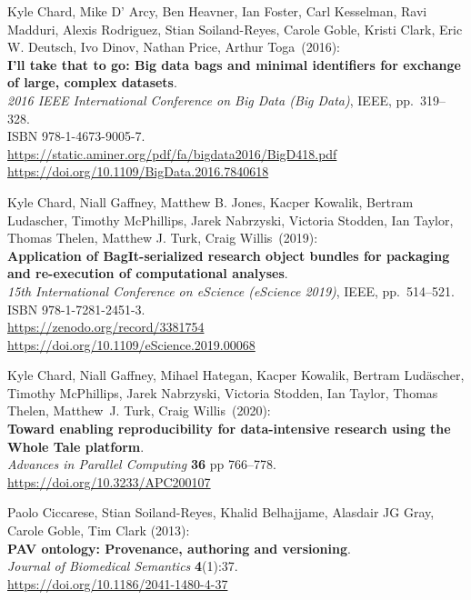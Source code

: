 \begin{thebibliography}{9}
Kyle Chard, Mike D' Arcy, Ben Heavner, Ian Foster, Carl
Kesselman, Ravi Madduri, Alexis Rodriguez, Stian Soiland-Reyes, Carole
Goble, Kristi Clark, Eric W. Deutsch, Ivo Dinov, Nathan Price, Arthur
Toga~(2016):\\
\textbf{I'll take that to go: Big data bags and minimal identifiers for
exchange of large, complex datasets}.\\
\emph{2016 IEEE International Conference on Big Data (Big Data)}, IEEE,
pp.~319--328.\\
ISBN 978-1-4673-9005-7.\\
\url{https://static.aminer.org/pdf/fa/bigdata2016/BigD418.pdf}\\
\url{https://doi.org/10.1109/BigData.2016.7840618}

Kyle Chard, Niall Gaffney, Matthew B. Jones, Kacper Kowalik,
Bertram Ludascher, Timothy McPhillips, Jarek Nabrzyski, Victoria
Stodden, Ian Taylor, Thomas Thelen, Matthew J. Turk, Craig Willis~(2019):\\
\textbf{Application of BagIt-serialized research object bundles for
packaging and re-execution of computational analyses}.\\
\emph{15th International Conference on eScience (eScience 2019)}, IEEE,
pp.~514--521.\\
ISBN 978-1-7281-2451-3.\\
\url{https://zenodo.org/record/3381754}\\
\url{https://doi.org/10.1109/eScience.2019.00068}

Kyle Chard, Niall Gaffney, Mihael Hategan, Kacper Kowalik,
Bertram Ludäscher, Timothy McPhillips, Jarek Nabrzyski, Victoria
Stodden, Ian Taylor, Thomas Thelen, Matthew~J. Turk, Craig Willis~(2020):\\
\textbf{Toward enabling reproducibility for data-intensive research
using the Whole Tale platform}.\\
\emph{Advances in Parallel Computing} \textbf{36} pp 766--778.\\
\url{https://doi.org/10.3233/APC200107}

Paolo Ciccarese, Stian Soiland-Reyes, Khalid Belhajjame, Alasdair JG
Gray, Carole Goble, Tim Clark (2013): \\
\textbf{PAV ontology: Provenance, authoring and versioning}. \\
\emph{Journal of Biomedical Semantics} \textbf{4}(1):37.\\
\url{https://doi.org/10.1186/2041-1480-4-37}


\end{thebibliography}
